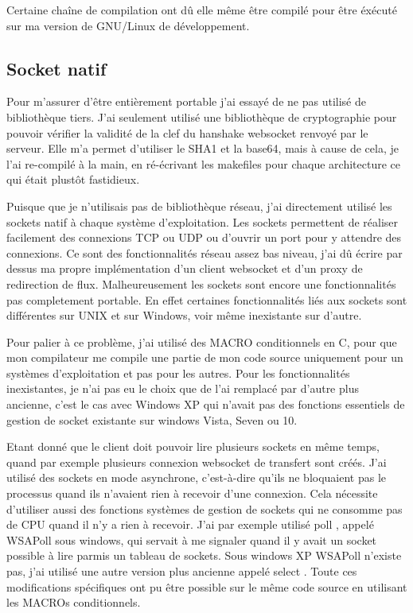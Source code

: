 Certaine chaîne de compilation ont dû elle même être compilé pour être éxécuté sur ma version de GNU/Linux de développement.

\subsection{Socket natif}

Pour m'assurer d'être entièrement portable j'ai essayé de ne pas utilisé de bibliothèque tiers. J'ai seulement utilisé une bibliothèque de cryptographie pour pouvoir vérifier la validité de la clef du hanshake websocket renvoyé par le serveur. Elle m'a permet d'utiliser le SHA1 et la base64, mais à cause de cela, je l'ai re-compilé à la main, en ré-écrivant les makefiles pour chaque architecture ce qui était plustôt fastidieux.

Puisque que je n'utilisais pas de bibliothèque réseau, j'ai directement utilisé les sockets natif à chaque système d'exploitation. Les sockets permettent de réaliser facilement des connexions TCP ou UDP ou d'ouvrir un port pour y attendre des connexions. Ce sont des fonctionnalités réseau assez bas niveau, j'ai dû écrire par dessus ma propre implémentation d'un client websocket et d'un proxy de redirection de flux. Malheureusement les sockets sont encore une fonctionnalités pas completement portable. En effet certaines fonctionnalités liés aux sockets sont différentes sur UNIX et sur Windows, voir même inexistante sur d'autre.

Pour palier à ce problème, j'ai utilisé des MACRO conditionnels en C, pour que mon compilateur me compile une partie de mon code source uniquement pour un systèmes d'exploitation et pas pour les autres. Pour les fonctionnalités inexistantes, je n'ai pas eu le choix que de l'ai remplacé par d'autre plus ancienne, c'est le cas avec Windows XP qui n'avait pas des fonctions essentiels de gestion de socket existante sur windows Vista, Seven ou 10.

Etant donné que le client doit pouvoir lire plusieurs sockets en même temps, quand par exemple plusieurs connexion websocket de transfert sont créés. J'ai utilisé des sockets en mode asynchrone, c'est-à-dire qu'ils ne bloquaient pas le processus quand ils n'avaient rien à recevoir d'une connexion. Cela nécessite d'utiliser aussi des fonctions systèmes de gestion de sockets qui ne consomme pas de CPU quand il n'y a rien à recevoir. J'ai par exemple utilisé \og poll \fg{}, appelé \og WSAPoll \fg{} sous windows, qui servait à me signaler quand il y avait un socket possible à lire parmis un tableau de sockets. Sous windows XP \og WSAPoll \fg{} n'existe pas, j'ai utilisé une autre version plus ancienne appelé \og select \fg{}. Toute ces modifications spécifiques ont pu être possible sur le même code source en utilisant les MACROs conditionnels.

